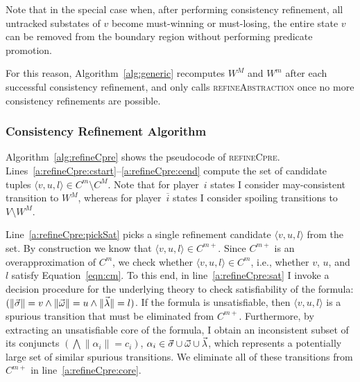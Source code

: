 Note that in the special case when, after performing consistency refinement, all untracked substates of $v$ become must-winning or must-losing, the entire state $v$ can be removed from the boundary region without performing predicate promotion. 

For this reason, Algorithm~\ref{alg:generic} recomputes $W^M$ and $W^m$ after each successful consistency refinement, and only calls \textsc{refineAbstraction} once no more consistency refinements are possible.

\subsubsection{Consistency Refinement Algorithm}

Algorithm~\ref{alg:refineCpre} shows the pseudocode of \textsc{refineCpre}.  Lines~\ref{a:refineCpre:cstart}--\ref{a:refineCpre:cend} compute the set of candidate tuples $\langle v, u, l\rangle\in C^m\setminus C^M$.  Note that for player~$i$ states I consider may-consistent transition to $W^M$, whereas for player~$\overline{i}$ states I consider spoiling transitions to $V\setminus W^M$.

Line~\ref{a:refineCpre:pickSat} picks a single refinement candidate $\langle v,u,l \rangle$ from the set.  By construction we know that $\langle v,u,l\rangle\in C^{m+}$.  Since $C^{m+}$ is an overapproximation of $C^m$, we check whether $\langle v,u,l\rangle\in C^m$, i.e., whether $v$, $u$, and $l$ satisfy Equation~\ref{eqn:cm}.  To this end, in line~\ref{a:refineCpre:sat} I invoke a decision procedure for the underlying theory to check satisfiability of the formula:$(\|\vec{\sigma}\|=v \land \|\vec{\omega}\|=u \land \|\vec{\lambda}\|=l)$. If the formula is unsatisfiable, then $\langle v,u,l\rangle$ is a spurious transition that must be eliminated from $C^{m+}$.  Furthermore, by extracting an unsatisfiable core of the formula, I obtain an inconsistent subset of its conjuncts $(\bigwedge\|\alpha_i\|=c_i)$, $\alpha_i\in\vec{\sigma}\cup\vec{\omega}\cup\vec{\lambda}$, which represents a potentially large set of similar spurious transitions.  We eliminate all of these transitions from $C^{m+}$ in line~\ref{a:refineCpre:core}.

